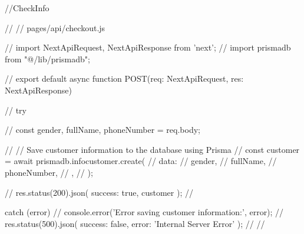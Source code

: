 //CheckInfo

// // pages/api/checkout.js

// import { NextApiRequest, NextApiResponse } from 'next';
// import prismadb from "@/lib/prismadb";

// export default async function POST(req: NextApiRequest, res: NextApiResponse) {
//     try {
//       const { gender, fullName, phoneNumber } = req.body;

//       // Save customer information to the database using Prisma
//       const customer = await prismadb.infocustomer.create({
//         data: {
//           gender,
//           fullName,
//           phoneNumber,
//         },
//       });

//       res.status(200).json({ success: true, customer });
//     } catch (error) {
//       console.error('Error saving customer information:', error);
//       res.status(500).json({ success: false, error: 'Internal Server Error' });
//     }
// }
